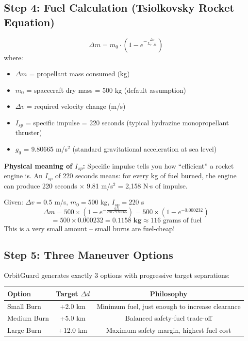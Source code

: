 \documentclass[12pt,a4paper]{article}
\begin{document}
\subsection{Step 4: Fuel Calculation (Tsiolkovsky Rocket Equation)}

\begin{formulabox}[title=Formula: Tsiolkovsky Rocket Equation]
\[
\Delta m = m_0 \cdot \left(1 - e^{-\frac{\Delta v}{I_{sp} \cdot g_0}}\right)
\]
where:
\begin{itemize}
    \item $\Delta m$ = propellant mass consumed (kg)
    \item $m_0$ = spacecraft dry mass = 500 kg (default assumption)
    \item $\Delta v$ = required velocity change (m/s)
    \item $I_{sp}$ = specific impulse = 220 seconds (typical hydrazine monopropellant thruster)
    \item $g_0$ = 9.80665 m/s$^2$ (standard gravitational acceleration at sea level)
\end{itemize}

\textbf{Physical meaning of $I_{sp}$:} Specific impulse tells you how ``efficient'' a rocket engine is. An $I_{sp}$ of 220 seconds means: for every kg of fuel burned, the engine can produce 220 seconds $\times$ 9.81 m/s$^2$ = 2,158 N$\cdot$s of impulse.
\end{formulabox}

\begin{realdatabox}[title=Worked Example: Fuel Cost for 0.5 m/s Burn]
Given: $\Delta v = 0.5$ m/s, $m_0 = 500$ kg, $I_{sp} = 220$ s
\[
\Delta m = 500 \times \left(1 - e^{-\frac{0.5}{220 \times 9.80665}}\right) = 500 \times \left(1 - e^{-0.000232}\right)
\]
\[
= 500 \times 0.000232 = \mathbf{0.1158 \text{ kg}} \approx 116 \text{ grams of fuel}
\]
This is a very small amount -- small burns are fuel-cheap!
\end{realdatabox}

\subsection{Step 5: Three Maneuver Options}

OrbitGuard generates exactly 3 options with progressive target separations:
\begin{center}
\begin{tabular}{lcc}
\toprule
\textbf{Option} & \textbf{Target $\Delta d$} & \textbf{Philosophy} \\
\midrule
Small Burn & +2.0 km & Minimum fuel, just enough to increase clearance \\
Medium Burn & +5.0 km & Balanced safety-fuel trade-off \\
Large Burn & +12.0 km & Maximum safety margin, highest fuel cost \\
\bottomrule
\end{tabular}
\end{center}
\end{document}
